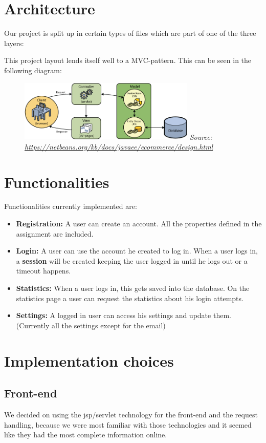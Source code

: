 \documentclass{article}
\begin{document}
\section{Architecture}
Our project is split up in certain types of files which are part of one of the three layers:

This project layout lends itself well to a MVC-pattern. This can be seen in the following diagram:

\begin{figure}[h]
\centering
\includegraphics[width=0.75\textwidth]{mvc-diagram.png}
\small\textit{Source:\url{ https://netbeans.org/kb/docs/javaee/ecommerce/design.html}}
\end{figure}
\section{Functionalities}
Functionalities currently implemented are:

\begin{itemize}
\item \textbf{Registration:} A user can create an account. All the properties defined in the assignment are included.
\item \textbf{Login:} A user can use the account he created to log in. When a user logs in, a \textbf{session} will be created keeping the user logged in until he logs out or a timeout happens.
\item \textbf{Statistics:} When a user logs in, this gets saved into the database. On the statistics page a user can request the statistics about his login attempts.
\item \textbf{Settings:} A logged in user can access his settings and update them. (Currently all the settings except for the email)
\end{itemize}

\section{Implementation choices}
\subsection{Front-end}
We decided on using the jsp/servlet technology for the front-end and the request handling, because we were most familiar with those technologies and it seemed like they had the most complete information online.
\end{document}
